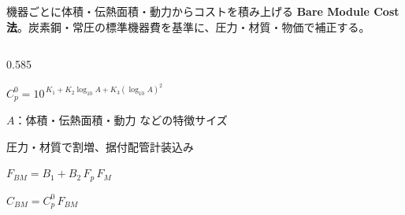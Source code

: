 \begin{frame}[t]

  \vspace*{1.2mm}
  {\footnotesize 機器ごとに体積・伝熱面積・動力からコストを積み上げる
   \textbf{Bare Module Cost 法}。炭素鋼・常圧の標準機器費を基準に、圧力・材質・物価で補正する。}\par

  \vspace{0.55em}
  \begin{columns}[T,onlytextwidth]
    \begin{column}{0.585\textwidth}
      \par
      \vspace{0.2em}
      {\small\boldmath$C_p^0 = 10^{\,K_1 + K_2\log_{10}\!A + K_3(\log_{10}\!A)^2}$\unboldmath}\par
      {\scriptsize $A$：体積・伝熱面積・動力 などの特徴サイズ}\par

      \vspace{0.55em}
      \par
      \vspace{0.15em}
      {\scriptsize 圧力・材質で割増、据付配管計装込み}\par
      \vspace{0.2em}
      {\small\boldmath$F_{BM} = B_1 + B_2\,F_p\,F_M$\unboldmath}\par

      \vspace{0.55em}
      \par
      \vspace{0.2em}
      {\small\boldmath$C_{BM} = C_p^0\,F_{BM}$\unboldmath}\par


\end{column}
\end{columns}
\end{frame}
